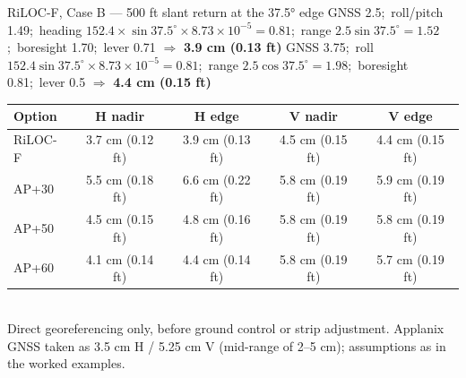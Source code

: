 \begin{worked}{RiLOC-F, Case B --- 500 ft slant return at the 37.5° edge}
 GNSS 2.5;\ roll/pitch 1.49;\ heading $152.4\times\sin37.5^\circ\times8.73\times10^{-5}=0.81$;\ range $2.5\sin37.5^\circ=1.52$;\ boresight 1.70;\ lever 0.71 $\Rightarrow$ \textbf{3.9 cm (0.13 ft)}
 GNSS 3.75;\ roll $152.4\sin37.5^\circ\times8.73\times10^{-5}=0.81$;\ range $2.5\cos37.5^\circ=1.98$;\ boresight 0.81;\ lever 0.5 $\Rightarrow$ \textbf{4.4 cm (0.15 ft)}
\end{worked}


\begin{center}\small
\renewcommand{\arraystretch}{1.2}
\begin{tabular}{lcccc}\toprule
\textbf{Option} & \textbf{H nadir} & \textbf{H edge} & \textbf{V nadir} & \textbf{V edge}\\\midrule
RiLOC-F & 3.7 cm (0.12 ft) & 3.9 cm (0.13 ft) & 4.5 cm (0.15 ft) & 4.4 cm (0.15 ft)\\
AP+30 & 5.5 cm (0.18 ft) & 6.6 cm (0.22 ft) & 5.8 cm (0.19 ft) & 5.9 cm (0.19 ft)\\
AP+50 & 4.5 cm (0.15 ft) & 4.8 cm (0.16 ft) & 5.8 cm (0.19 ft) & 5.8 cm (0.19 ft)\\
AP+60 & 4.1 cm (0.14 ft) & 4.4 cm (0.14 ft) & 5.8 cm (0.19 ft) & 5.7 cm (0.19 ft)\\\bottomrule
\end{tabular}\\[2pt]
{\footnotesize Direct georeferencing only, before ground control or strip adjustment. Applanix GNSS taken as 3.5 cm H / 5.25 cm V (mid-range of 2--5 cm); assumptions as in the worked examples.}
\end{center}


